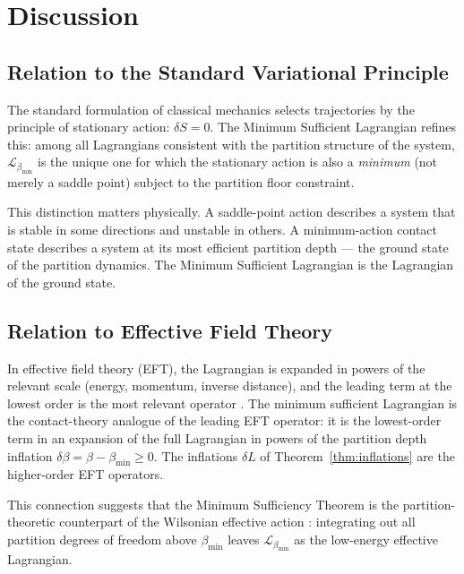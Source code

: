 \documentclass[12pt, a4paper]{article}
\theoremstyle{plain}
\theoremstyle{definition}
\theoremstyle{remark}
\newcommand{\bmin}{\beta_{\min}}
\newcommand{\Lmin}{\mathcal{L}_{\bmin}}
\begin{document}
\section{Discussion}
\label{sec:discussion}

\subsection{Relation to the Standard Variational Principle}

The standard formulation of classical mechanics selects trajectories by the
principle of stationary action: $\delta S = 0$. The Minimum Sufficient
Lagrangian refines this: among all Lagrangians consistent with the partition
structure of the system, $\Lmin$ is the unique one for which the stationary
action is also a \emph{minimum} (not merely a saddle point) subject to the
partition floor constraint.

This distinction matters physically. A saddle-point action describes a system
that is stable in some directions and unstable in others. A minimum-action
contact state describes a system at its most efficient partition depth ---
the ground state of the partition dynamics. The Minimum Sufficient Lagrangian
is the Lagrangian of the ground state.

\subsection{Relation to Effective Field Theory}

In effective field theory (EFT), the Lagrangian is expanded in powers of the
relevant scale (energy, momentum, inverse distance), and the leading term at
the lowest order is the most relevant operator \citep{georgi1994effective}.
The minimum sufficient Lagrangian is the contact-theory analogue of the leading
EFT operator: it is the lowest-order term in an expansion of the full Lagrangian
in powers of the partition depth inflation $\delta\beta = \beta - \bmin \geq 0$.
The inflations $\delta L$ of Theorem~\ref{thm:inflations} are the higher-order
EFT operators.

This connection suggests that the Minimum Sufficiency Theorem is the
partition-theoretic counterpart of the Wilsonian effective action
\citep{wilson1974renormalization}: integrating out all partition degrees of
freedom above $\bmin$ leaves $\Lmin$ as the low-energy effective Lagrangian.
\end{document}
